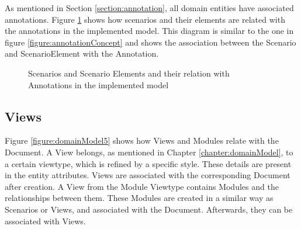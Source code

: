 As mentioned in Section \ref{section:annotation}, all domain entities have associated annotations. Figure \ref{figure:modelScenariosAnnotations} shows how scenarios and their elements are related with the annotations in the implemented model. This diagram is similar to the one in figure \ref{figure:annotationConcept} and shows the association between the Scenario and ScenarioElement with the Annotation.

\begin{figure}
\centering
\renewcommand {\umltextcolor}{black}
\renewcommand {\umlfillcolor}{none}
\renewcommand {\umldrawcolor}{black}

\caption{Scenarios and Scenario Elements and their relation with Annotations in the implemented model}
\label{figure:modelScenariosAnnotations}
\end{figure}

\subsection{Views}


Figure \ref{figure:domainModel5} shows how Views and Modules relate with the Document. A View belongs, as mentioned in Chapter \ref{chapter:domainModel}, to a certain viewtype, which is refined by a specific style. These details are present in the entity attributes. Views are associated with the corresponding Document after creation.
A View from the Module Viewtype contains Modules and the relationships between them. 
These Modules are created in a similar way as Scenarios or Views, and associated with the Document. Afterwards, they can be associated with Views.

